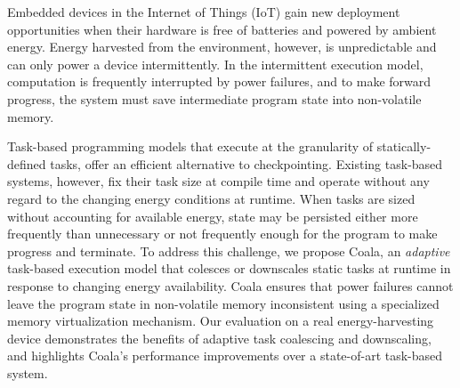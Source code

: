 Embedded devices in the Internet of Things (IoT) gain new deployment
opportunities when their hardware is free of batteries and powered by ambient
energy.
Energy harvested from the environment, however, is unpredictable
and can only power a device intermittently.
In the intermittent execution model, computation is frequently interrupted by
power failures, and to make forward progress, the system must save intermediate
program state into non-volatile memory.

Task-based programming models that execute at the granularity of
statically-defined tasks, offer an efficient alternative to checkpointing.
%
Existing task-based systems, however, fix their task size at compile time and
operate without any regard to the changing energy conditions at runtime.
%
When tasks are sized without accounting for available energy, state may be
persisted either more frequently than unnecessary or not frequently enough for
the program to make progress and terminate.
%
To address this challenge, we propose Coala, an \emph{adaptive} task-based
execution model that colesces or downscales static tasks at runtime in response
to changing energy availability.
Coala ensures that power failures cannot leave the program state in
non-volatile memory inconsistent using a specialized memory virtualization
mechanism.
%
Our evaluation on a real energy-harvesting device demonstrates the benefits of
adaptive task coalescing and downscaling, and highlights Coala's performance
improvements over a state-of-art task-based system.


